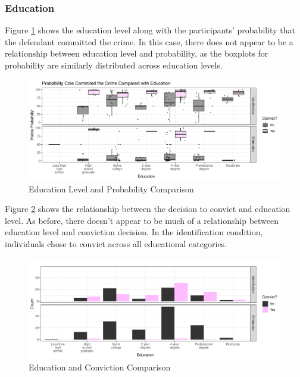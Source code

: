 \documentclass[print]{nuthesis}
\begin{document}
\hypertarget{education}{%
\subsubsection{Education}\label{education}}

Figure \ref{fig:probeduc} shows the education level along with the participants' probability that the defendant committed the crime.
In this case, there does not appear to be a relationship between education level and probability, as the boxplots for probability are similarly distributed across education levels.

\begin{figure}

{\centering \includegraphics[width=\linewidth]{thesis_files/figure-latex/probeduc-1} 

}

\caption{Education Level and Probability Comparison}\label{fig:probeduc}
\end{figure}

Figure \ref{fig:convictseduc} shows the relationship between the decision to convict and education level.
As before, there doesn't appear to be much of a relationship between education level and conviction decision.
In the identification condition, individuals chose to convict across all educational categories.

\begin{figure}

{\centering \includegraphics[width=\linewidth]{thesis_files/figure-latex/convictseduc-1} 

}

\caption{Education and Conviction Comparison}\label{fig:convictseduc}
\end{figure}
\end{document}
